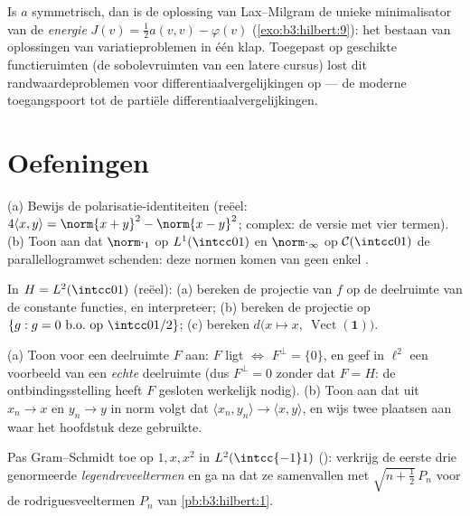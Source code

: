 \begin{remark}\label{rem:b3:hilbert:variational}
Is $a$ symmetrisch, dan is de oplossing van Lax--Milgram de
unieke minimalisator van de \emph{energie} $J(v) = \frac12a(v,v)
- \varphi(v)$ (\cref{exo:b3:hilbert:9}): het bestaan van
oplossingen van variatieproblemen in één klap. Toegepast op
geschikte functieruimten (de sobolevruimten van een latere
cursus) lost dit randwaardeproblemen voor
differentiaalvergelijkingen op --- de moderne toegangspoort tot
de partiële differentiaalvergelijkingen.
\end{remark}

\section{Oefeningen}

\begin{exercise}[$\star$]\label{exo:b3:hilbert:1}
(a) Bewijs de polarisatie-identiteiten (reëel: $4\langle x,
y\rangle = \norm{x+y}^2 - \norm{x-y}^2$; complex: de versie met
vier termen).
(b) Toon aan dat $\norm\cdot_1$ op $L^1(\intcc01)$ en
$\norm\cdot_\infty$ op $\mathcal C(\intcc01)$ de
parallellogramwet schenden: deze normen komen van geen enkel
.
\end{exercise}

\begin{exercise}[$\star$]\label{exo:b3:hilbert:2}
In $H = L^2(\intcc01)$ (reëel):
(a) bereken de projectie van $f$ op de deelruimte van de
constante functies, en interpreteer;
(b) bereken de projectie op $\{g : g = 0 \text{ b.o.\ op }
\intcc0{1/2}\}$;
(c) bereken $d\bigl(x \mapsto x,\ \operatorname{Vect}(\mathbf
1)\bigr)$.
\end{exercise}

\begin{exercise}[$\star\star$]\label{exo:b3:hilbert:3}
(a) Toon voor een deelruimte $F$ aan: $F$ ligt  $\iff$
$F^\perp = \{0\}$, en geef in $\ell^2$ een voorbeeld van een
\emph{echte}  deelruimte (dus $F^\perp = 0$ zonder dat $F =
H$: de ontbindingsstelling heeft $F$ gesloten werkelijk nodig).
(b) Toon aan dat uit $x_n \to x$ en $y_n \to y$ in norm volgt dat
$\langle x_n, y_n\rangle \to \langle x, y\rangle$, en wijs twee
plaatsen aan waar het hoofdstuk deze  gebruikte.
\end{exercise}

\begin{exercise}[$\star\star$]\label{exo:b3:hilbert:4}
Pas Gram--Schmidt toe op $1, x, x^2$ in $L^2(\intcc{-1}1)$
(): verkrijg de eerste drie genormeerde
\emph{legendreveeltermen} en ga na dat ze samenvallen met
$\sqrt{n + \frac12}\,P_n$ voor de rodriguesveeltermen $P_n$ van
\cref{pb:b3:hilbert:1}.
\end{exercise}


